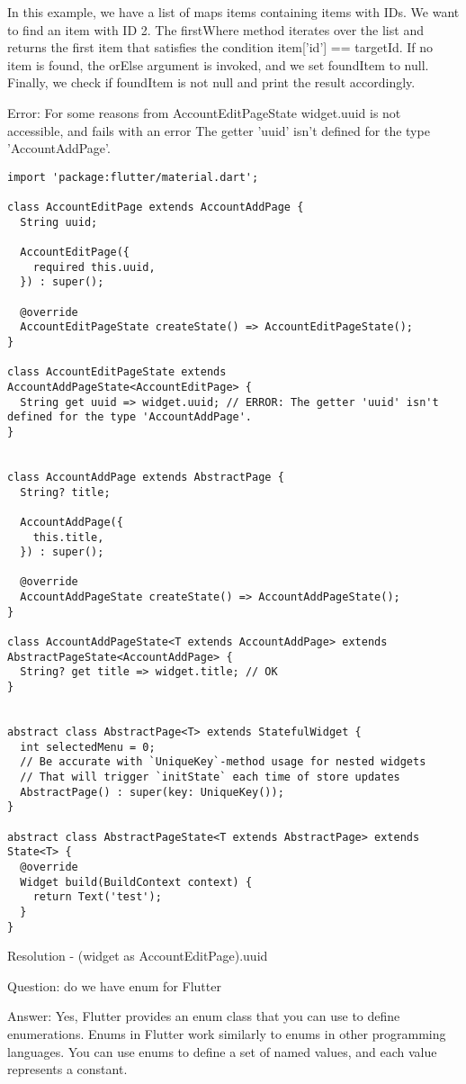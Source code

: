In this example, we have a list of maps items containing items with IDs. We want to find an item with ID 2. 
The firstWhere method iterates over the list and returns the first item that satisfies the condition 
item['id'] == targetId. If no item is found, the orElse argument is invoked, and we set foundItem to null. 
Finally, we check if foundItem is not null and print the result accordingly.

Error: For some reasons from AccountEditPageState widget.uuid is not accessible, and fails with an error The getter 
'uuid' isn't defined for the type 'AccountAddPage'.

\begin{lstlisting}
import 'package:flutter/material.dart';

class AccountEditPage extends AccountAddPage {
  String uuid;

  AccountEditPage({
    required this.uuid,
  }) : super();

  @override
  AccountEditPageState createState() => AccountEditPageState();
}

class AccountEditPageState extends AccountAddPageState<AccountEditPage> {
  String get uuid => widget.uuid; // ERROR: The getter 'uuid' isn't defined for the type 'AccountAddPage'.
}


class AccountAddPage extends AbstractPage {
  String? title;

  AccountAddPage({
    this.title,
  }) : super();

  @override
  AccountAddPageState createState() => AccountAddPageState();
}

class AccountAddPageState<T extends AccountAddPage> extends AbstractPageState<AccountAddPage> {
  String? get title => widget.title; // OK
}


abstract class AbstractPage<T> extends StatefulWidget {
  int selectedMenu = 0;
  // Be accurate with `UniqueKey`-method usage for nested widgets
  // That will trigger `initState` each time of store updates 
  AbstractPage() : super(key: UniqueKey());
}

abstract class AbstractPageState<T extends AbstractPage> extends State<T> {
  @override
  Widget build(BuildContext context) {
    return Text('test');
  }
}
\end{lstlisting}

Resolution - (widget as AccountEditPage).uuid


Question: do we have enum for Flutter

Answer: Yes, Flutter provides an enum class that you can use to define enumerations. Enums in Flutter work similarly to 
enums in other programming languages. You can use enums to define a set of named values, and each value represents 
a constant.

